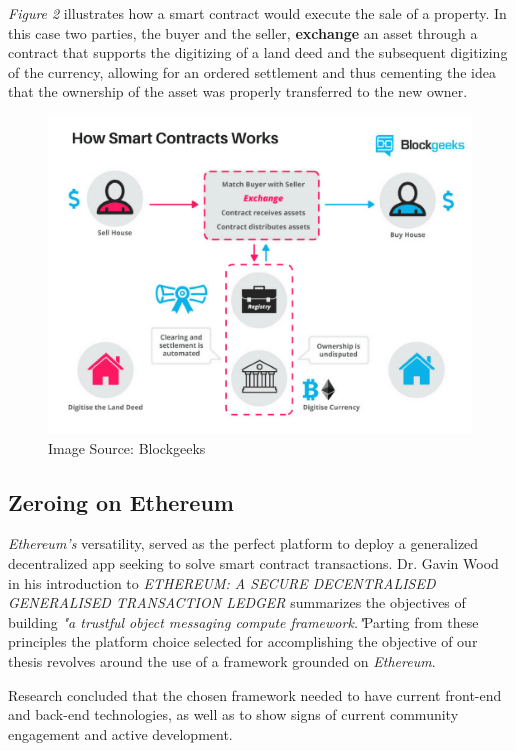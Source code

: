 \documentclass[submission,copyright,creativecommons]{eptcs}
\begin{document}
\textit{Figure 2} illustrates how a smart contract would execute the sale of a property.  In this case two parties, the buyer and the seller, \textbf{exchange} an asset through a contract that supports the digitizing of a land deed and the subsequent digitizing of the currency, allowing for an ordered settlement and thus cementing the idea that the ownership of the asset was properly transferred to the new owner\cite{WhatAreSmart}.
\begin{figure}[h]
    \centering
    \label{fig:howsmartcontractsworks}
    \includegraphics[width=5in]{How-Smart-Contracts-Works-1.png}
     \caption{Image Source: Blockgeeks}
\end{figure}

\subsection{Zeroing on Ethereum}
\textit{Ethereum's} versatility, served as the perfect platform to deploy a generalized decentralized app seeking to solve smart contract transactions.  Dr. Gavin Wood in his introduction to \textit{ETHEREUM: A SECURE DECENTRALISED GENERALISED TRANSACTION LEDGER} summarizes the objectives of building \textit{"a trustful object messaging compute framework."}\cite{wood2014ethereum}Parting from these principles the platform choice selected for accomplishing the objective of our thesis revolves around the use of a framework grounded on \textit{Ethereum}. 

Research concluded that the chosen framework needed to have current front-end and back-end technologies, as well as to show signs of current community engagement and active development.  
\end{document}
